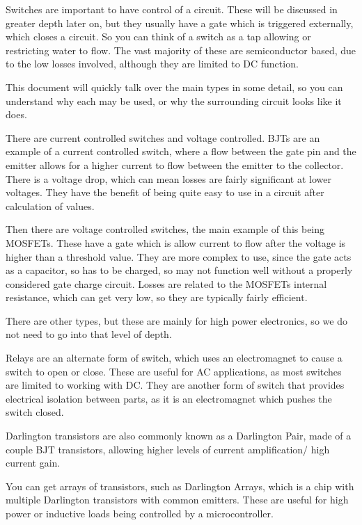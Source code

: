 \documentclass[a4paper,11pt]{report}
\begin{document}
Switches are important to have control of a circuit. These will be discussed in greater depth later on, but they usually have a gate which is triggered externally, which closes a circuit. So you can think of a switch as a tap allowing or restricting water to flow. The vast majority of these are semiconductor based, due to the low losses involved, although they are limited to DC function.

This document will quickly talk over the main types in some detail, so you can understand why each may be used, or why the surrounding circuit looks like it does.

There are current controlled switches and voltage controlled. BJTs are an example of a current controlled switch, where a flow between the gate pin and the emitter allows for a higher current to flow between the emitter to the collector. There is a voltage drop, which can mean losses are fairly significant at lower voltages. They have the benefit of being quite easy to use in a circuit after calculation of values.

Then there are voltage controlled switches, the main example of this being MOSFETs. These have a gate which is allow current to flow after the voltage is higher than a threshold value. They are more complex to use, since the gate acts as a capacitor, so has to be charged, so may not function well without a properly considered gate charge circuit. Losses are related to the MOSFETs internal resistance, which can get very low, so they are typically fairly efficient.

There are other types, but these are mainly for high power electronics, so we do not need to go into that level of depth.

Relays are an alternate form of switch, which uses an electromagnet to cause a switch to open or close. These are useful for AC applications, as most switches are limited to working with DC. They are another form of switch that provides electrical isolation between parts, as it is an electromagnet which pushes the switch closed.

Darlington transistors are also commonly known as a Darlington Pair, made of a couple BJT transistors, allowing higher levels of current amplification/ high current gain.

You can get arrays of transistors, such as Darlington Arrays, which is a chip with multiple Darlington transistors with common emitters. These are useful for high power or inductive loads being controlled by a microcontroller.
\end{document}
